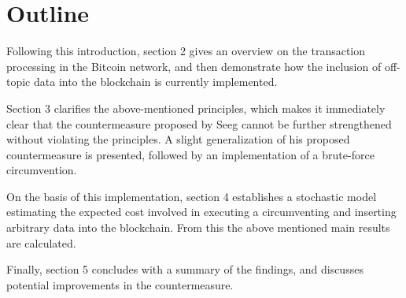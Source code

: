 \documentclass[a4paper,11pt,titlepage]{scrbook}
\begin{document}

\section{Outline}

Following this introduction, section 2 gives an overview on the transaction processing in the Bitcoin network, and then demonstrate how the inclusion of off-topic data into the blockchain is currently implemented.

Section 3 clarifies the above-mentioned principles, which makes it immediately clear that the countermeasure proposed by Seeg cannot be further strengthened without violating the principles.
A slight generalization of his proposed countermeasure is presented, followed by an implementation of a brute-force circumvention.

On the basis of this implementation, section 4 establishes a stochastic model estimating the expected cost involved in executing a circumventing and inserting arbitrary data into the blockchain.
From this the above mentioned main results are calculated.

Finally, section 5 concludes with a summary of the findings, and discusses potential improvements in the countermeasure.






\end{document}

